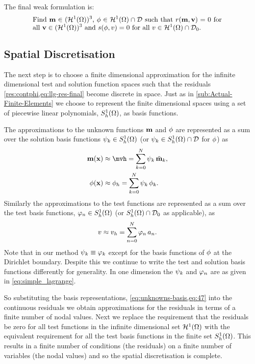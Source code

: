 The final weak formulation is:
\begin{equation}
  \eqpar{Find $\mv \in (\tsinf)^3$, $\phim \in \tsinf \cap \Dfs$ such that $\rllg(\mv, \testv) = 0$ for all $\testv \in (\tsinf)^3$ and $\rphi(\phim, \test) = 0$ for all $\test \in \tsinf \cap \Dfs_0$.}
\label{eq:inf-dim-problem}
\end{equation}




\subsection{Spatial Discretisation}
\label{sec:spat-discr-resi}

The next step is to choose a finite dimensional approximation for the infinite dimensional test and solution function spaces such that the residuals \cref{res:contphi,eq:llg-res-final} become discrete in space.
Just as in \cref{sub:Actual-Finite-Elements} we choose to represent the finite dimensional spaces using a set of piecewise linear polynomials, ${S_h^1(\Omega)}$, as basis functions.

The approximations to the unknown functions $\boldsymbol{\mathrm{m}}$ and $\phi$ are represented as a sum over the solution basis functions ${\psi_k} \in {S_h^1(\Omega)}$ (or ${\psi_k} \in {S_h^1(\Omega)} \cap \mathcal{D}$ for $\phi$) as
\begin{equation}
  \begin{aligned}
    \mv(\xv) &\approx \mvh = \sum_{k = 0}^{N} \sk \, \mvdis_k, \\
    \phim(\xv) &\approx \phimh = \sum_{k = 0}^{N} \sk \, \phim_{k}.
    \label{eq:unknowns-basis}
  \end{aligned}
\end{equation}
Similarly the approximations to the test functions are represented as a sum over the test basis functions, ${\varphi_n} \in {S_h^1(\Omega)}$ (or ${S_h^1(\Omega)} \cap \mathcal{D}_0$ as applicable), as
\begin{equation}
  \label{eq:47}
  v \approx {v}_h = \sum_{n = 0}^{N} {\varphi_n} \, a_n.
\end{equation}
Note that in our method $\psi_k \equiv \varphi_k$ except for the basis functions of  $\phi$ at the Dirichlet boundary.
Despite this we continue to write the test and solution basis functions differently for generality.
In one dimension the ${\psi_k}$ and ${\varphi_n}$ are as given in \cref{eq:simple_lagrange}.

So substituting the basis representations, \cref{eq:unknowns-basis,eq:47} into the continuous residuals we obtain approximations for the residuals in terms of a finite number of nodal values.
Next we replace the requirement that the residuals be zero for all test functions in the infinite dimensional set ${\mathcal{H}^1(\Omega)}$ with the equivalent requirement for all the test basis functions in the finite set ${S_h^1(\Omega)}$.
This results in a finite number of conditions (the residuals) on a finite number of variables (the nodal values) and so the spatial discretisation is complete.


